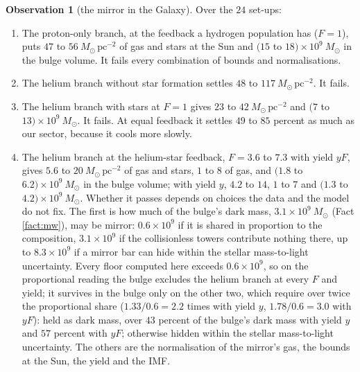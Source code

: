 \documentclass[11pt]{article}
\theoremstyle{definition}
\newtheorem{observation}[theorem]{Observation}
\newcommand{\Msun}{M_{\odot}}
\begin{document}
\begin{observation}[the mirror in the Galaxy]\label{obs:galaxy}
Over the $24$ set-ups:
\begin{enumerate}
\item[(i)] The proton-only branch, at the feedback a hydrogen population has ($F = 1$), puts $47$ to $56\ \Msun\,\mathrm{pc^{-2}}$ of gas and stars at the Sun and $(15$ to $18) \times 10^{9}\ \Msun$ in the bulge volume. It fails every combination of bounds and normalisations.
\item[(ii)] The helium branch without star formation settles $48$ to $117\ \Msun\,\mathrm{pc^{-2}}$. It fails.
\item[(iii)] The helium branch with stars at $F = 1$ gives $23$ to $42\ \Msun\,\mathrm{pc^{-2}}$ and $(7$ to $13) \times 10^{9}\ \Msun$. It fails. At equal feedback it settles $49$ to $85$ percent as much as our sector, because it cools more slowly.
\item[(iv)] The helium branch at the helium-star feedback, $F = 3.6$ to $7.3$ with yield $yF$, gives $5.6$ to $20\ \Msun\,\mathrm{pc^{-2}}$ of gas and stars, $1$ to $8$ of gas, and $(1.8$ to $6.2) \times 10^{9}\ \Msun$ in the bulge volume; with yield $y$, $4.2$ to $14$, $1$ to $7$ and $(1.3$ to $4.2) \times 10^{9}\ \Msun$. Whether it passes depends on choices the data and the model do not fix. The first is how much of the bulge's dark mass, $3.1 \times 10^{9}\ \Msun$ (Fact \ref{fact:mw}), may be mirror: $0.6 \times 10^{9}$ if it is shared in proportion to the composition, $3.1 \times 10^{9}$ if the collisionless towers contribute nothing there, up to $8.3 \times 10^{9}$ if a mirror bar can hide within the stellar mass-to-light uncertainty. Every floor computed here exceeds $0.6 \times 10^{9}$, so on the proportional reading the bulge excludes the helium branch at every $F$ and yield; it survives in the bulge only on the other two, which require over twice the proportional share ($1.33/0.6 = 2.2$ times with yield $y$, $1.78/0.6 = 3.0$ with $yF$): held as dark mass, over $43$ percent of the bulge's dark mass with yield $y$ and $57$ percent with $yF$; otherwise hidden within the stellar mass-to-light uncertainty. The others are the normalisation of the mirror's gas, the bounds at the Sun, the yield and the IMF.


\end{enumerate}
\end{observation}
\end{document}
